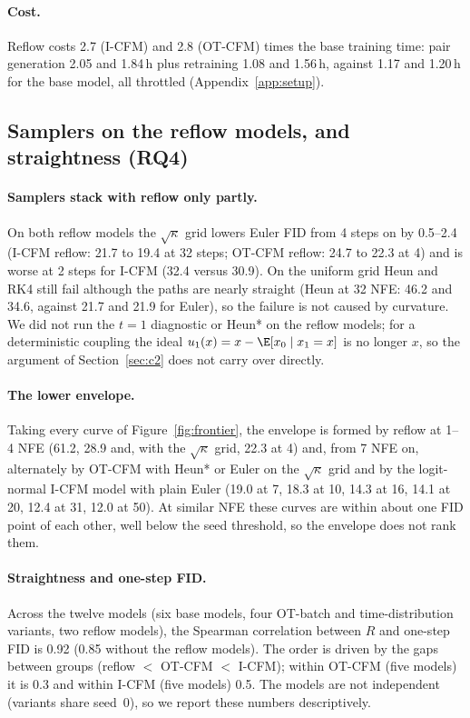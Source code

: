 \paragraph{Cost.} Reflow costs 2.7 (I-CFM) and 2.8 (OT-CFM) times the base training time: pair generation 2.05 and 1.84\,h plus retraining 1.08 and 1.56\,h, against 1.17 and 1.20\,h for the base model, all throttled (Appendix~\ref{app:setup}). %

\subsection{Samplers on the reflow models, and straightness (RQ4)}\label{app:c6}
\paragraph{Samplers stack with reflow only partly.} On both reflow models the $\sqrt\kappa$ grid lowers Euler FID from 4 steps on by 0.5--2.4 (I-CFM reflow: 21.7 to 19.4 at 32 steps; OT-CFM reflow: 24.7 to 22.3 at 4) and is worse at 2 steps for I-CFM (32.4 versus 30.9). On the uniform grid Heun and RK4 still fail although the paths are nearly straight (Heun at 32 NFE: 46.2 and 34.6, against 21.7 and 21.9 for Euler), so the failure is not caused by curvature. We did not run the $t=1$ diagnostic or Heun* on the reflow models; for a deterministic coupling the ideal $u_1(x)=x-\E[x_0\mid x_1=x]$ is no longer $x$, so the argument of Section~\ref{sec:c2} does not carry over directly. %
\paragraph{The lower envelope.} Taking every curve of Figure~\ref{fig:frontier}, the envelope is formed by reflow at 1--4 NFE (61.2, 28.9 and, with the $\sqrt\kappa$ grid, 22.3 at 4) and, from 7 NFE on, alternately by OT-CFM with Heun* or Euler on the $\sqrt\kappa$ grid and by the logit-normal I-CFM model with plain Euler (19.0 at 7, 18.3 at 10, 14.3 at 16, 14.1 at 20, 12.4 at 31, 12.0 at 50). At similar NFE these curves are within about one FID point of each other, well below the seed threshold, so the envelope does not rank them.
\paragraph{Straightness and one-step FID.} Across the twelve models (six base models, four OT-batch and time-distribution variants, two reflow models), the Spearman correlation between $R$ and one-step FID is 0.92 (0.85 without the reflow models). The order is driven by the gaps between groups (reflow $<$ OT-CFM $<$ I-CFM); within OT-CFM (five models) it is 0.3 and within I-CFM (five models) 0.5. The models are not independent (variants share seed~0), so we report these numbers descriptively.

